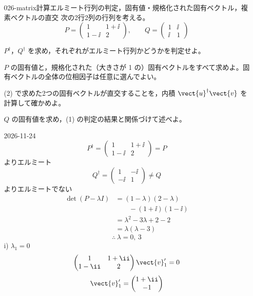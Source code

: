 \documentclass[uplatex,dvipdfmx,a4paper,11pt]{jsarticle}
\begin{document}
\mondaihen
{}
\begin{mondai}{026-matrix}{計算}{エルミート行列の判定，固有値・規格化された固有ベクトル，複素ベクトルの直交}
次の2行2列の行列を考える。
  \[ P=\begin{pmatrix}1 & 1+\ii\\ 1-\ii & 2\end{pmatrix},\qquad Q=\begin{pmatrix}1 & \ii\\ \ii & 1\end{pmatrix} \]
  \begin{shoumon}
    \item $P^{\dagger}$，$Q^{\dagger}$ を求め，それぞれがエルミート行列かどうかを判定せよ。
    \item $P$ の固有値と，規格化された（大きさが 1 の）固有ベクトルをすべて求めよ。固有ベクトルの全体の位相因子は任意に選んでよい。
    \item (2) で求めた2つの固有ベクトルが直交することを，内積 $\vect{u}^{\dagger}\vect{v}$ を計算して確かめよ。
    \item $Q$ の固有値を求め，(1) の判定の結果と関係づけて述べよ。
  \end{shoumon}
\begin{kotaeutsushi}{2026-11-24}
\[ P^{\dagger}=\begin{pmatrix}1 & 1+\ii\\ 1-\ii & 2\end{pmatrix}=P \]
よりエルミート
\[ Q^{\dagger}=\begin{pmatrix}1 & -\ii\\ -\ii & 1\end{pmatrix}\neq Q \]
よりエルミートでない
\begin{align*}
\det(P-\lambda I)&=(1-\lambda)(2-\lambda)\\
&\qquad-(1+\ii)(1-\ii)\\
&=\lambda^{2}-3\lambda+2-2\\
&=\lambda(\lambda-3)
\end{align*}
\[ \therefore\ \lambda=0,\ 3 \]
i) $\lambda_{1}=0$
\[ \begin{pmatrix}1 & 1+\ii\\ 1-\ii & 2\end{pmatrix}\vect{v}_{1}'=0 \]
\[ \vect{v}_{1}'=\begin{pmatrix}1+\ii\\ -1\end{pmatrix} \]

\end{kotaeutsushi}
\end{mondai}
\end{document}
